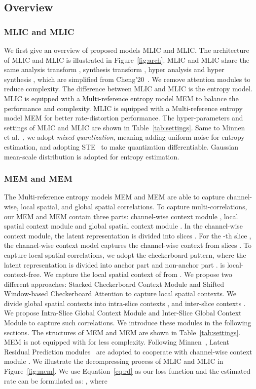 \documentclass[sigconf]{acmart}
\begin{document}
\subsection{Overview}
\subsubsection{MLIC and MLIC}
We first give an overview of proposed models MLIC and MLIC.
The architecture of MLIC and MLIC is illustrated in Figure~\ref{fig:arch}.
MLIC and MLIC share the same analysis transform , synthesis transform ,
hyper analysis  and hyper synthesis , which are simplified from
Cheng'20~\cite{DBLP:conf/cvpr/ChengSTK20}.
We remove attention modules to reduce complexity.
The difference between MLIC and MLIC is the entropy model.
MLIC is equipped with a Multi-reference entropy model MEM to balance the performance and complexity.
MLIC is equipped with a Multi-reference entropy model MEM
for better rate-distortion performance.
The hyper-parameters and settings of MLIC and MLIC are shown in Table~\ref{tab:settings}.
Same to Minnen et al.~\cite{DBLP:conf/icip/MinnenS20},
we adopt \textit{mixed quantization}, meaning adding uniform noise for entropy estimation,
and adopting STE~\cite{DBLP:conf/iclr/TheisSCH17} to make quantization differentiable.
Gaussian mean-scale distribution is adopted for entropy estimation.
\subsubsection{MEM and MEM}
The Multi-reference entropy models MEM and MEM are able to
capture channel-wise, local spatial, and global spatial correlations.
To capture multi-correlations, our MEM and MEM contain three parts:
channel-wise context module , local spatial context module  and
global spatial context module .
In the channel-wise context module, the latent representation 
is divided into slices .
For the -th slice , the channel-wise context model captures
the channel-wise context  from slices .
To capture local spatial correlations, we adopt the checkerboard pattern, where
the latent representation  is divided into
anchor part  and non-anchor part .
 is local-context-free.
We capture the local spatial context  of
 from .
We propose two different approaches:
Stacked Checkerboard Context Module  and
Shifted Window-based Checkerboard Attention  to capture local spatial contexts.
We divide global spatial contexts  into
intra-slice contexts , and inter-slice contexts .
We propose Intra-Slice Global Context Module  and
Inter-Slice Global Context Module  to capture such correlations.
We introduce these modules in the following sections.
The structures of MEM and MEM are shown in Table~\ref{tab:settings}.
MEM is not equipped with  for less complexity.
Following Minnen~\cite{DBLP:conf/icip/MinnenS20},
Latent Residual Prediction modules~\cite{DBLP:conf/icip/MinnenS20} are adopted
to cooperate with channel-wise context module .
We illustrate the decompressing process of MLIC and MLIC in Figure~\ref{fig:mem}.
We use Equation~\ref{eq:rd} as our loss function
and the estimated rate can be formulated as:
, where
\end{document}
